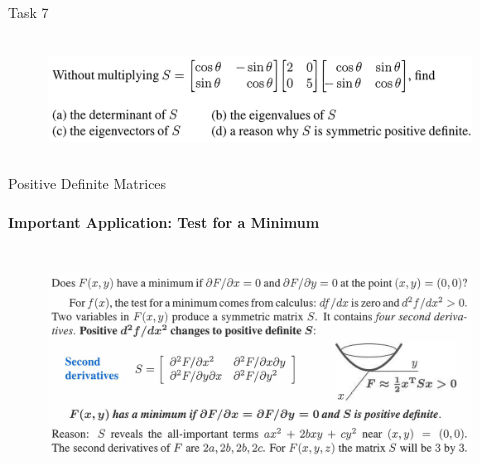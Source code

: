 \documentclass[aspectratio=169]{beamer}
\begin{document}
\begin{frame}[t]{Task 7}
    \framesubtitle{}
    \vspace{-0.5cm}
    \begin{figure}[H]
        \centering\includegraphics[height=3cm,width=1\textwidth,keepaspectratio]{7.png}
        \label{fig:7.png}
    \end{figure}
\end{frame}

\begin{frame}[t]{Positive Definite Matrices}
    \framesubtitle{Important Application: Test for a Minimum}
    \vspace{-0.5cm}
        \begin{figure}[H]
            \centering\includegraphics[height=6cm,width=1\textwidth,keepaspectratio]{test_for_minimum.png}
            \label{fig:test_for_minimum.png}
        \end{figure}
    \end{frame}
\end{document}
